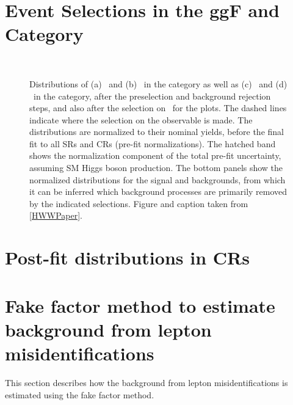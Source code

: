 \FloatBarrier
\section{Event Selections in the ggF \ZeroJet and \OneJet Category}
\label{app:event-selection-ggf}

\begin{figure}[!h]
    \centering
     \\
  \caption{
  Distributions of (a) \mll\ and (b) \dphill\ in the \ZeroJet category as well as (c) \mll\ and (d) \dphill\ in the \OneJet category, after the preselection and background rejection steps, and also after the selection on \mll\ for the \dphill plots. The dashed lines indicate where the selection on the observable is made. The distributions are normalized to
  their nominal yields, before the final fit to all SRs and CRs (pre-fit normalizations). The hatched band shows the normalization component of the total pre-fit uncertainty, assuming SM Higgs boson production. The bottom panels show the normalized distributions for the signal and backgrounds, from which it can be inferred which background processes are primarily removed by the indicated selections.
  Figure and caption taken from \cref{HWWPaper}. 
  \label{fig:ggf:Plots:selections}
  }
  \end{figure}
  
\FloatBarrier
\section{Post-fit distributions in CRs}
\label{app:post-fit-cr-dists}


\FloatBarrier
\section{Fake factor method to estimate background from lepton misidentifications}
\label{app:fake-factor-method}
This section describes how the background from lepton misidentifications is estimated using the fake factor method.


